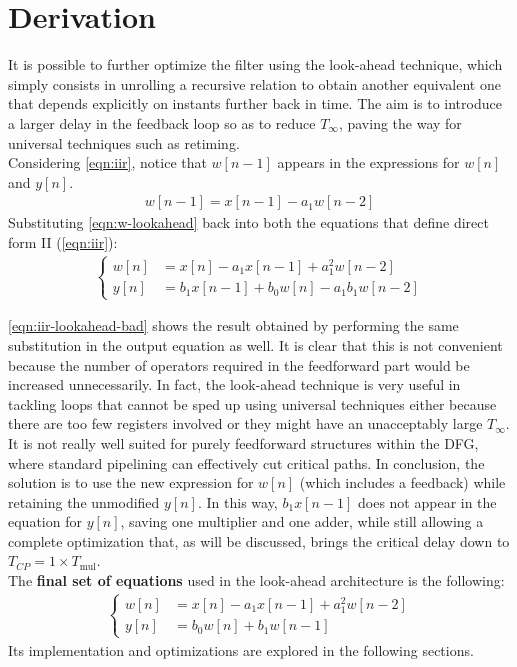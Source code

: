 \section{Derivation}
It is possible to further optimize the filter using the look-ahead technique, which simply consists in unrolling a recursive relation to obtain another equivalent one that depends explicitly on instants further back in time. The aim is to introduce a larger delay in the feedback loop so as to reduce $T_{\infty}$, paving the way for universal techniques such as retiming.\\
Considering \autoref{eqn:iir}, notice that $w[n-1]$ appears in the expressions for $w[n]$ and $y[n]$.
\begin{align}
	w[n-1] = x[n-1] - a_1 w[n-2]
	\label{eqn:w-lookahead}
\end{align}
Substituting \autoref{eqn:w-lookahead} back into both the equations that define direct form II (\autoref{eqn:iir}):
\begin{align}
	\begin{cases}
		w[n] &= x[n] - a_1 x[n-1] + a_1^2 w[n-2] 		\\
		y[n] &= b_1 x[n-1] + b_0 w[n] - a_1 b_1 w[n-2]
	\end{cases}
	\label{eqn:iir-lookahead-bad}
\end{align}

\autoref{eqn:iir-lookahead-bad} shows the result obtained by performing the same substitution in the output equation as well. It is clear that this is not convenient because the number of operators required in the feedforward part would be increased unnecessarily. In fact, the look-ahead technique is very useful in tackling loops that cannot be sped up using universal techniques either because there are too few registers involved or they might have an unacceptably large $T_{\infty}$. It is not really well suited for purely feedforward structures within the DFG, where standard pipelining can effectively cut critical paths. In conclusion, the solution is to use the new expression for $w[n]$ (which includes a feedback) while retaining the unmodified $y[n]$. In this way, $b_1 x[n-1]$ does not appear in the equation for $y[n]$, saving one multiplier and one adder, while still allowing a complete optimization that, as will be discussed, brings the critical delay down to $T_{CP}=1 \times T_\text{mul}$.
\\
The \textbf{final set of equations} used in the look-ahead architecture is the following:
\begin{align}
	\begin{cases}
		w[n] &= x[n] - a_1 x[n-1] + a_1^2 w[n-2] 		\\
		y[n] &= b_0 w[n] + b_1 w[n-1]
	\end{cases}
	\label{eqn:iir-lookahead}
\end{align}
Its implementation and optimizations are explored in the following sections.

